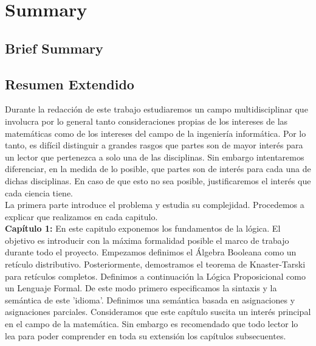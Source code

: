 
\newpage



\chapter*{Summary}
\section*{Brief Summary}



\section*{Resumen Extendido}

Durante la redacción de este trabajo estudiaremos un campo multidisciplinar que involucra por lo general tanto consideraciones propias de los intereses de las matemáticas como de los intereses del campo de la ingeniería informática. Por lo tanto, es difícil distinguir a grandes rasgos que partes son de mayor interés para un lector que pertenezca a solo una de las disciplinas. Sin embargo intentaremos diferenciar, en la medida de lo posible, que partes son de interés para cada una de dichas disciplinas. En caso de que esto no sea posible, justificaremos el interés que cada ciencia tiene.\\

La primera parte introduce el problema y estudia su complejidad. Procedemos a explicar que realizamos en cada capitulo.\\

\textbf{Capítulo 1:} En este capitulo exponemos los fundamentos de la lógica. El objetivo es introducir con la máxima formalidad posible el marco de trabajo durante todo el proyecto. 
Empezamos definimos el Álgebra Booleana como un retículo distributivo. Posteriormente, demostramos el teorema de Knaster-Tarski para retículos completos. Definimos a continuación la Lógica Proposicional como un Lenguaje Formal. De este modo primero especificamos la sintaxis y la semántica de este 'idioma'. Definimos una semántica basada en asignaciones y asignaciones parciales. 
Consideramos que este capítulo suscita un interés principal en el campo de la matemática. Sin embargo es recomendado que todo lector lo lea para poder comprender en toda su extensión los capítulos subsecuentes.\\

